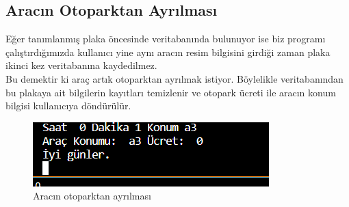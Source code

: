 \subsection{Aracın Otoparktan Ayrılması }
Eğer tanımlanmış plaka öncesinde veritabanında bulunuyor ise biz programı çalıştırdığımızda kullanıcı yine aynı aracın resim bilgisini girdiği zaman plaka ikinci kez veritabanına kaydedilmez. \\
Bu demektir ki araç artık otoparktan ayrılmak istiyor. Böylelikle veritabanından bu plakaya ait bilgilerin kayıtları temizlenir ve otopark ücreti ile aracın konum bilgisi kullanıcıya döndürülür.

 \begin{figure}
    \centering
    \includegraphics{aracın otoparktan çıkışı.PNG}
    \caption{Aracın otoparktan ayrılması }
    \label{fig:my_label}
\end{figure} \\